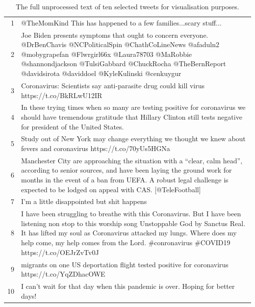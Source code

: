 \begin{table}[]
    \centering
    \setlength{\parindent}{-1em}
    \begin{tabular}{|r|p{16cm}|}
    \hline
1 & \negindent @TheMomKind This has happened to a few families...scary stuff... \\
2 & \negindent Joe Biden presents symptoms that ought to concern everyone. @DrBenChavis @NCPoliticalSpin @ChathCoLineNews @afaduln2 @mobygrapefan @Flwrgirl66x @Laura78703 @MaRobbie @shannondjackson @TulsiGabbard @ChuckRocha @TheBernReport @davidsirota @daviddoel @KyleKulinski @cenkuygur \\
3 & \negindent Coronavirus: Scientists say anti-parasite drug could kill virus https://t.co/BkRLwU12IR \\
4 & \negindent In these trying times when so many are testing positive for coronavirus we should have tremendous gratitude that Hillary Clinton still tests negative for president of the United States. \\
5 & \negindent Study out of New York may change everything we thought we knew about fevers and coronavirus   https://t.co/70yUs5HGNa \\
6 & \negindent Manchester City are approaching the situation with a \textquotedblleft{}clear, calm head\textquotedblright{}, according to senior sources, and have been laying the ground work for months in the event of a ban from UEFA. A robust legal challenge is expected to be lodged on appeal with CAS.  [@TeleFootball] \\
7 & \negindent I'm a little disappointed but shit happens \\
8 & \negindent I have been struggling to breathe with this Coronavirus. But I have been listening non stop to this worship song Unstoppable God by Sanctus Real. It has lifted my soul as Coronavirus attacked my lungs. Where does my help come, my help comes from the Lord. \#conronavirus \#COVID19 https://t.co/OEJrZvTv0J \\
9 & \negindent 44 migrants on one US deportation flight tested positive for coronavirus https://t.co/YqZDhacOWE \\
10 & \negindent I can't wait for that day when this pandemic is over.   Hoping for better days!\\
\hline
    \end{tabular}
    \caption{The full unprocessed text of ten selected tweets for visualisation purposes.}
    \label{tab:p2t-ten_tweets}
\end{table}

